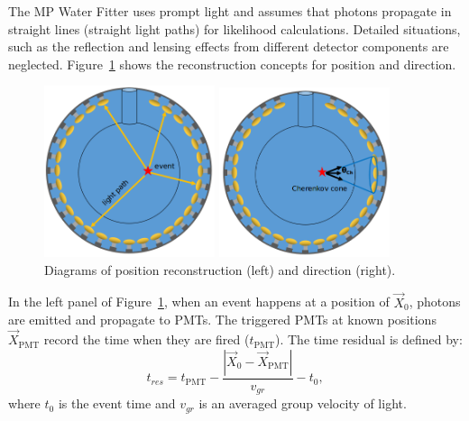 \documentclass[preprint,12pt]{elsarticle}
\numberwithin{equation}{section}
\begin{document}
The MP Water Fitter uses prompt light and assumes that photons propagate in straight lines (straight light paths) for likelihood calculations. Detailed situations, such as the reflection and lensing effects from different detector components are neglected. Figure~\ref{mpwdiagram} shows the reconstruction concepts for position and direction.
\begin{figure}[htbp]
	\centering
	\begin{minipage}[t]{0.45\textwidth}
		\centering
		\includegraphics[width=5cm]{mpwDiagram.png}
	\end{minipage}
	\begin{minipage}[t]{0.4\textwidth}
		\centering
		\includegraphics[width=5cm]{mpwDiagram2.png}
	\end{minipage}
	\caption{Diagrams of position reconstruction (left) and direction (right).}
	\label{mpwdiagram}
\end{figure}

In the left panel of Figure~\ref{mpwdiagram}, when an event happens at a position of $\vec{X}_{0}$, photons are emitted and propagate to PMTs. The triggered PMTs at known positions $\vec{X}_\mathrm{PMT}$ record the time when they are fired ($t_\mathrm{PMT}$). The time residual is defined by: 
\begin{equation}
t_{res} = t_\mathrm{PMT}-\frac{|\vec{X}_{0}-\vec{X}_\mathrm{PMT}|}{v_{gr}}-t_0,
\end{equation}
where $t_0$ is the event time and $v_{gr}$ is an averaged group velocity of light.
\end{document}
